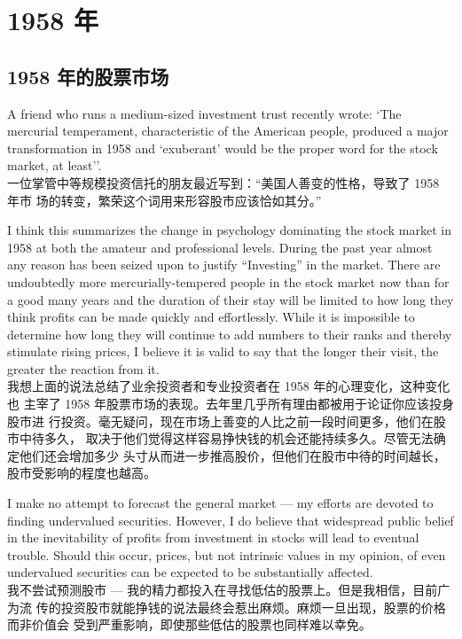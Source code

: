 \chapter{1958 年}

\section{1958 年的股票市场}

\begin{verseparallel}
  {
    \noindent A friend who runs a medium-sized investment trust recently wrote:
    `The mercurial temperament, characteristic of the American people, produced
    a major transformation in 1958 and `exuberant' would be the proper word
    for the stock market, at least''. \\
  }
  {
    一位掌管中等规模投资信托的朋友最近写到：“美国人善变的性格，导致了 1958 年市
    场的转变，繁荣这个词用来形容股市应该恰如其分。”
  }
\end{verseparallel}

\begin{verseparallel}
  {
    I think this summarizes the change in psychology dominating the stock market
    in 1958 at both the amateur and professional levels. During the past year
    almost any reason has been seized upon to justify “Investing” in the
    market. There are undoubtedly more mercurially-tempered people in the stock
    market now than for a good many years and the duration of their stay will be
    limited to how long they think profits can be made quickly and effortlessly.
    While it is impossible to determine how long they will continue to add
    numbers to their ranks and thereby stimulate rising prices, I believe it is
    valid to say that the longer their visit, the greater the reaction from it. \\
  }
  {
    我想上面的说法总结了业余投资者和专业投资者在 1958 年的心理变化，这种变化也
    主宰了 1958 年股票市场的表现。去年里几乎所有理由都被用于论证你应该投身股市进
    行投资。毫无疑问，现在市场上善变的人比之前一段时间更多，他们在股市中待多久，
    取决于他们觉得这样容易挣快钱的机会还能持续多久。尽管无法确定他们还会增加多少
    头寸从而进一步推高股价，但他们在股市中待的时间越长，股市受影响的程度也越高。
  }
\end{verseparallel}

\begin{verseparallel}
  {
    I make no attempt to forecast the general market --- my efforts are devoted
    to finding undervalued securities. However, I do believe that widespread
    public belief in the inevitability of profits from investment in stocks will
    lead to eventual trouble. Should this occur, prices, but not intrinsic
    values in my opinion, of even undervalued securities can be expected to be
    substantially affected. \\
  }
  {
    我不尝试预测股市 --- 我的精力都投入在寻找低估的股票上。但是我相信，目前广为流
    传的投资股市就能挣钱的说法最终会惹出麻烦。麻烦一旦出现，股票的价格而非价值会
    受到严重影响，即使那些低估的股票也同样难以幸免。
  }
\end{verseparallel}

